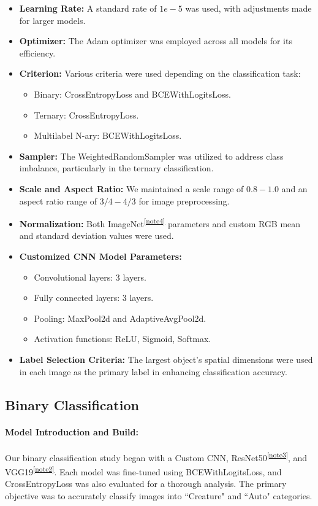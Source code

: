 \documentclass{article} %
\begin{document}
\begin{itemize}
  \item \textbf{Learning Rate:} A standard rate of \(1e-5\) was used, with adjustments made for larger models.
  \item \textbf{Optimizer:} The Adam optimizer was employed across all models for its efficiency.
  \item \textbf{Criterion:} Various criteria were used depending on the classification task:
    \begin{itemize}
      \item Binary: CrossEntropyLoss and BCEWithLogitsLoss.
      \item Ternary: CrossEntropyLoss.
      \item Multilabel N-ary: BCEWithLogitsLoss.
    \end{itemize}
  \item \textbf{Sampler:} The WeightedRandomSampler was utilized to address class imbalance, particularly in the ternary classification.
  \item \textbf{Scale and Aspect Ratio:} We maintained a scale range of \(0.8-1.0\) and an aspect ratio range of \(3/4-4/3\) for image preprocessing.
  \item \textbf{Normalization:} Both ImageNet\textsuperscript{\ref{note4}}  parameters and custom RGB mean and standard deviation values were used.
  \item \textbf{Customized CNN Model Parameters:}
    \begin{itemize}
      \item Convolutional layers: 3 layers.
      \item Fully connected layers: 3 layers.
      \item Pooling: MaxPool2d and AdaptiveAvgPool2d.
      \item Activation functions: ReLU, Sigmoid, Softmax.
    \end{itemize}
  \item \textbf{Label Selection Criteria:} The largest object's spatial dimensions were used in each image as the primary label in enhancing classification accuracy.
\end{itemize}


\subsection{Binary Classification}
\paragraph{Model Introduction and Build:} 
Our binary classification study began with a Custom CNN, ResNet50\textsuperscript{\ref{note3}}, and VGG19\textsuperscript{\ref{note2}}. Each model was fine-tuned using BCEWithLogitsLoss, and CrossEntropyLoss was also evaluated for a thorough analysis. The primary objective was to accurately classify images into ``Creature" and ``Auto" categories.
\end{document}

